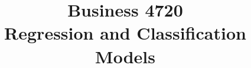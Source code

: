 \documentclass{article}
\title{Business 4720\\ \vspace{\baselineskip}
Regression and Classification Models}
\begin{document}
\maketitle

\vfill

\clearpage


\end{document}
